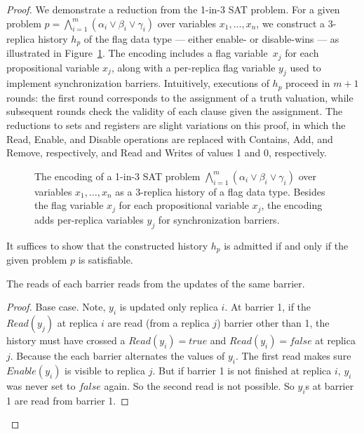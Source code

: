 \begin{proof}

  We demonstrate a reduction from the 1-in-3 SAT problem. For a given problem $p = \bigwedge_{i=1}^{m} (\alpha_i \lor \beta_i \lor \gamma_i)$ over variables $x_1, \ldots, x_n$, we construct a 3-replica history $h_p$ of the flag data type — either enable- or disable-wins — as illustrated in Figure~\ref{fig:3sat-to-flags}. The encoding includes a flag variable~$x_j$ for each propositional variable $x_j$, along with a per-replica flag variable $y_j$ used to implement synchronization barriers. Intuitively, executions of $h_p$ proceed in $m+1$ rounds: the first round corresponds to the assignment of a truth valuation, while subsequent rounds check the validity of each clause given the assignment. The reductions to sets and registers are slight variations on this proof, in which the Read, Enable, and Disable operations are replaced with Contains, Add, and Remove, respectively, and Read and Writes of values 1 and 0, respectively.

  \begin{figure}[t]
    \centering
    {\scriptsize}
         \vspace{-1mm}
    \caption{The encoding of a 1-in-3 SAT problem $\bigwedge_{i=1}^{m} (\alpha_i \lor \beta_i \lor \gamma_i)$ over variables $x_1, \ldots, x_n$ as a 3-replica history of a flag data type. Besides the flag variable $x_j$ for each propositional variable $x_j$, the encoding adds per-replica variables $y_j$ for synchronization barriers.}
    \label{fig:3sat-to-flags}
    \vspace{-4mm}
  \end{figure}

  It suffices to show that the constructed history $h_p$ is admitted if and only if the given problem $p$ is satisfiable.

  \begin{lemma}
    \label{crdt:flag:npc-proof:lemma1}
    The reads of each barrier reads from the updates of the same barrier. 
  \end{lemma}

  \begin{proof}
    Base case. Note, $y_i$ is updated only replica $i$. At barrier 1, if the $Read(y_j)$ at replica $i$ are read (from a replica $j$) barrier other than 1, the history must have crossed a $Read(y_i) = true$ and $Read(y_i) = false$ at replica $j$. Because the each barrier alternates the values of $y_i$. The first read makes sure $Enable(y_i)$ is visible to replica $j$. But if barrier 1 is not finished at replica $i$, $y_i$ was never set to $false$ again. So the second read is not possible. So $y_i$s at barrier 1 are read from barrier 1.
    

\end{proof}
\end{proof}
